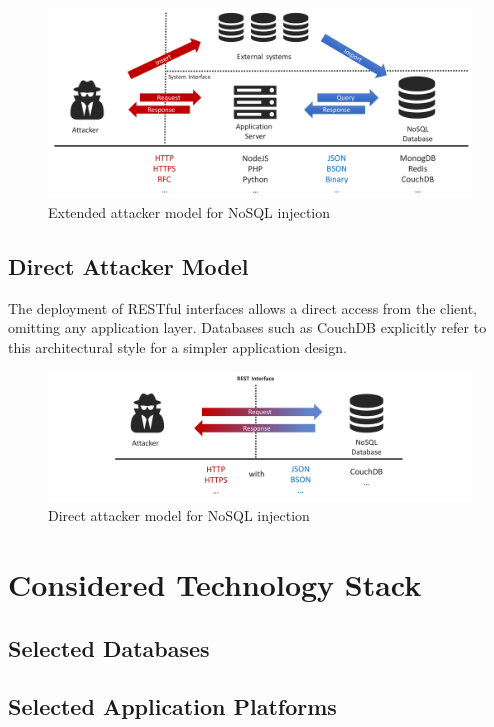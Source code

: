 \begin{figure}[h]
\centering
  \includegraphics[width=1\linewidth]{Images/attacker_model_extended}
  \caption{Extended attacker model for NoSQL injection}
  \label{fig:extendedAttackerModel}
\end{figure}


\subsection{Direct Attacker Model}

The deployment of RESTful interfaces allows a direct access from the client, omitting any application layer. Databases such as CouchDB explicitly refer to this architectural style for a simpler application design.


\begin{figure}[h]
\centering
  \includegraphics[width=1\linewidth]{Images/attacker_model_direct}
  \caption{Direct attacker model for NoSQL injection}
  \label{fig:extendedAttackerModel}
\end{figure}



\section{Considered Technology Stack}
\subsection{Selected Databases}
\subsection{Selected Application Platforms}